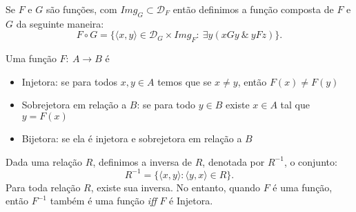 \begin{definition}[Composta]
  Se $F$ e $G$ são funções, com $\mathit{Img}_{G} \subset \mathcal{D}_{F}$ então definimos a função composta de $F$ e $G$ da seguinte maneira:
  $$ F \circ G = \{\langle x, y \rangle \in \mathcal{D}_{G} \times \mathit{Img}_{F}:\ \exists y (xGy\ \&\ yFz)\}.$$  
\end{definition}

\begin{center}
\end{center}

\begin{definition}[Natureza]
  Uma função $F:\ A \longrightarrow B$ é
\end{definition}
\begin{itemize}
  \item Injetora: se para todos $x, y \in A$ temos que se $x \neq y$, então $F(x) \neq F(y)$
  \item Sobrejetora em relação a $B$: se para todo $y \in B$ existe $x \in A$ tal que $y = F(x)$
  \item Bijetora: se ela é injetora e sobrejetora em relação a $B$
\end{itemize}

\begin{definition}[Inversa]
  Dada uma relação $R$, definimos a inversa de $R$, denotada por $R^{-1}$, o conjunto:
  $$R^{-1} = \{\langle x, y \rangle: \langle y, x \rangle \in R\}.$$
  Para toda relação $R$, existe sua inversa. No entanto, quando $F$ é uma função, então $F^{-1}$ também é uma função \textit{iff} $F$ é Injetora.
\end{definition}

